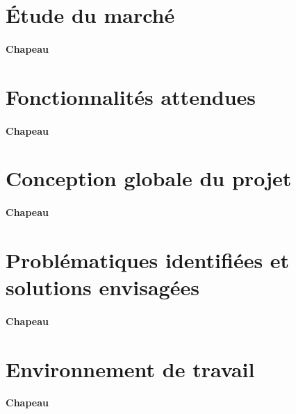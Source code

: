 \section{Étude du marché} \label{sec:etudeMarche}

\paragraph{Chapeau}


\section{Fonctionnalités attendues} \label{sec:foncAttendues}

\paragraph{Chapeau}


\section{Conception globale du projet} \label{sec:conception}

\paragraph{Chapeau}


\section{Problématiques identifiées et solutions envisagées} \label{sec:problemesSolutions}

\paragraph{Chapeau}


\section{Environnement de travail} \label{sec:environnement}

\paragraph{Chapeau}
